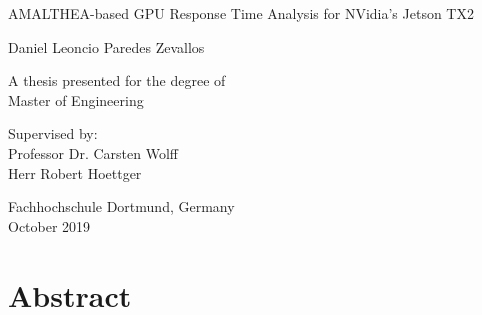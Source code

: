 \documentclass[
  12pt,
  a4paperpaper,
]{report}
\date{}
\begin{document}
\begin{titlepage}
    \begin{center}

        
        \vspace*{2.5cm}
        
        \huge
        AMALTHEA-based GPU Response Time Analysis for NVidia's Jetson TX2
        
        \vspace{1.5cm}
        
        \Large
        Daniel Leoncio Paredes Zevallos 

        \vspace{1.5cm}

        \normalsize
        A thesis presented for the degree of\\
        Master of Engineering
        
        \vfill
        
        \normalsize
        Supervised by:\\
        Professor Dr. Carsten Wolff\\
        Herr Robert Hoettger

        \vspace{0.8cm}

        
        \normalsize
        Fachhochschule Dortmund, Germany\\
        October 2019


    \end{center}
\end{titlepage}

\hypertarget{abstract}{%
\chapter*{Abstract}\label{abstract}}
\end{document}
